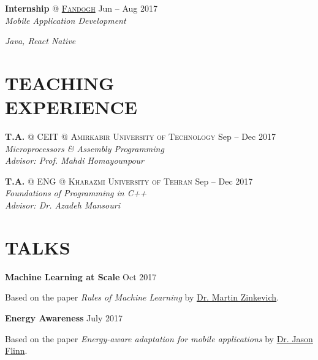 \documentclass[margin, 10pt]{res} %
\begin{document}
\begin{resume}
	\textbf{Internship} \textsc{@}
	\href{http://www.fandogh.org/}{\textsc{Fandogh}}
	\hfill {Jun -- Aug 2017}\\
	\textit{Mobile Application Development}
	\begin{innerlist}
		\item \textit{Java, React Native}
	\end{innerlist}

  	\vspace{0.5cm}
    
    \section{TEACHING \\ EXPERIENCE} 
    
   \textbf{T.A.} \textsc{@}
   \textsc{CEIT} \textsc{@} \textsc{Amirkabir University of Technology}
   \hfill {Sep -- Dec 2017}\\
   \textit{Microprocessors \& Assembly Programming}\\
   \textit{Advisor: Prof. Mahdi Homayounpour}
   
   \textbf{T.A.} \textsc{@}
   \textsc{ENG} \textsc{@} \textsc{Kharazmi University of Tehran}
   \hfill {Sep -- Dec 2017}\\
   \textit{Foundations of Programming in C++}\\
   \textit{Advisor: Dr. Azadeh Mansouri}
      	\vspace{0.5cm}
	\section{TALKS} 
	\textbf{Machine Learning at Scale}
	\hfill {Oct 2017}
		\vspace{0.15cm}
	\begin{innerlist}
		\item Based on the paper \textit{Rules of Machine Learning} by \href{http://martin.zinkevich.org/rules_of_ml/rules_of_ml.pdf}{Dr. Martin Zinkevich}.
	\end{innerlist}

	\textbf{Energy Awareness}
	\hfill {July 2017}
		\vspace{0.15cm}
	\begin{innerlist}
		\item Based on the paper \textit{Energy-aware adaptation for mobile applications} by \href{http://www-cgi.cs.cmu.edu/afs/cs.cmu.edu/Web/People/odyssey/docdir/s17.pdf5}{Dr. Jason Flinn}.
	\end{innerlist}


\end{resume}
\end{document}
